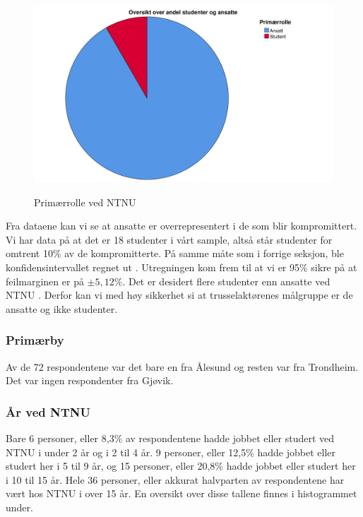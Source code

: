 \begin{figure}[H]
    \centering
    \includegraphics[scale=0.5]{case_2/bilder/spss/primaerrolle.pdf}
    \label{fig:case2-primaerrolle}
    \caption[Primærrolle ved NTNU]{Primærrolle ved NTNU}
\end{figure}

Fra dataene kan vi se at ansatte er overrepresentert i de som blir kompromittert. Vi har data på at det er 18 studenter i vårt sample, altså står studenter for omtrent 10\% av de kompromitterte. På samme måte som i forrige seksjon, ble konfidensintervallet regnet ut \cite{SSCalc}. Utregningen kom frem til at vi er 95\% sikre på at feilmarginen er på \(\pm 5,12\%\). Det er desidert flere studenter enn ansatte ved NTNU \cite{NTNUfakta}. Derfor kan vi med høy sikkerhet si at trusselaktørenes målgruppe er de ansatte og ikke studenter. 

\subsubsection{Primærby}
Av de 72 respondentene var det bare en fra Ålesund og resten var fra Trondheim. Det var ingen respondenter fra Gjøvik. 

\subsubsection{År ved NTNU}
Bare 6 personer, eller 8,3\% av respondentene hadde jobbet eller studert ved NTNU i under 2 år og i 2 til 4 år. 9 personer, eller 12,5\% hadde jobbet eller studert her i 5 til 9 år, og 15 personer, eller 20,8\% hadde jobbet eller studert her i 10 til 15 år. Hele 36 personer, eller akkurat halvparten av respondentene har vært hos NTNU i over 15 år. En oversikt over disse tallene finnes i histogrammet under. 

